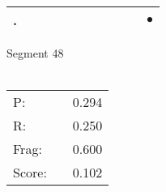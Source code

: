 \documentclass[landscape]{article}
\newcommand{\ssp}{\hspace{2pt}}
\newcommand{\mex}{\cellcolor{g}$\bullet$}
\begin{document}
\begin{tabular}{|l|p{10pt}|p{10pt}|p{10pt}|p{10pt}|p{10pt}|p{10pt}|p{10pt}|p{10pt}|p{10pt}|p{10pt}|}
\hline
\ssp \cellcolor{ref9}. \ssp&\hspace{2pt}&\hspace{2pt}&\hspace{2pt}&\hspace{2pt}&\hspace{2pt}&\hspace{2pt}&\hspace{2pt}&\hspace{2pt}&\hspace{2pt}&\hspace{2pt}\mex\\
\hline
\end{tabular}

\vspace{6pt}
\noindent Segment 48\\\\
\noindent\begin{tabular}{lm{12pt}r}
\hline
P:&&0.294\\
R:&&0.250\\
Frag:&&0.600\\
Score:&&0.102\\
\end{tabular}

\newpage
\end{document}
